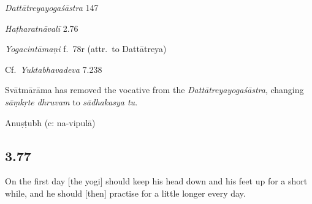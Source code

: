 \begin{ekdosis}
\begin{sources}[hp03_076]
\emph{Dattātreyayogaśāstra} 147
\begin{versinnote}
\end{versinnote}
\end{sources}

\begin{testimonia}[hp03_076]

\emph{Haṭharatnāvalī} 2.76
\begin{versinnote}
\end{versinnote}

\emph{Yogacintāmaṇi} f.~78r (attr.~to Dattātreya)
\begin{versinnote}
\end{versinnote}

Cf.~\emph{Yuktabhavadeva} 7.238
\begin{versinnote}
\end{versinnote}
\end{testimonia}

\begin{philcomm}[hp03_076]
Svātmārāma has removed the vocative from the \emph{Dattātreyayogaśāstra}, changing \emph{sāṃkṛte dhruvam} to \emph{sādhakasya tu}.
\end{philcomm}

\begin{metre}[hp03_076]
Anuṣṭubh (c: na-vipulā)
\end{metre}

\subsection*{3.77}
\begin{translation}[hp03_077]
On the first day [the yogi] should keep his head down and his feet up for a short while, and he should [then] practise for a little longer every day.
\end{translation}


\end{ekdosis}
